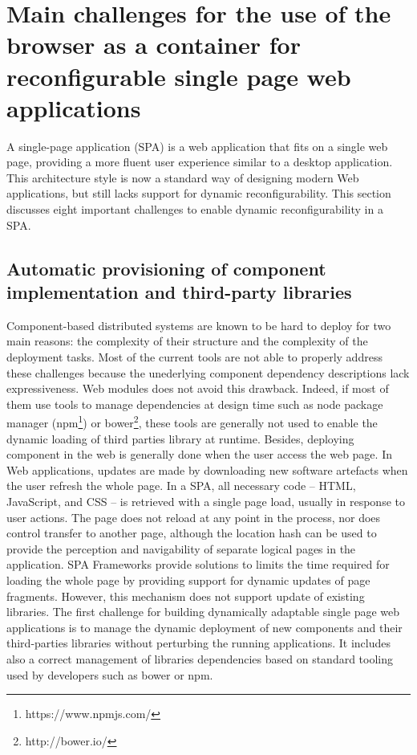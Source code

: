 \section{Main challenges for the use of the browser as a container for reconfigurable single page web applications }
A single-page application (SPA) is a web application that fits on a single web page, providing a more fluent user experience similar to a desktop application.
This architecture style is now a standard way of designing modern Web applications, but still lacks support for dynamic reconfigurability.
This section discusses eight important challenges to  enable dynamic reconfigurability in a SPA.

\subsection{Automatic provisioning of component implementation and third-party libraries}

Component-based distributed systems are known to be hard to deploy for two main reasons: the complexity of their structure and the complexity of the deployment tasks. Most of the current tools are not able to properly address these challenges because the unederlying component dependency descriptions lack expressiveness. Web modules does not avoid this drawback. Indeed, if most of them use tools to manage dependencies at design time such as node package manager (npm\footnote{https://www.npmjs.com/}) or bower\footnote{http://bower.io/}, these tools are generally not used to enable the dynamic loading of third parties library at runtime. Besides, deploying component in the web is generally done when the user access the web page. In Web applications, updates are made by downloading new software artefacts when the user refresh the whole page. In a SPA, all necessary code -- HTML, JavaScript, and CSS -- is retrieved with a single page load, usually in response to user actions. The page does not reload at any point in the process, nor does control transfer to another page, although the location hash can be used to provide the perception and navigability of separate logical pages in the application. SPA Frameworks provide solutions to limits the time required for loading the whole page by providing support for dynamic updates of page fragments. However, this mechanism does not support update of existing libraries. The first challenge for building dynamically adaptable single page web applications is to manage the dynamic deployment of new components and their third-parties libraries without perturbing the running applications. It includes also a correct management of libraries dependencies based on standard tooling used by developers such as bower or npm.

